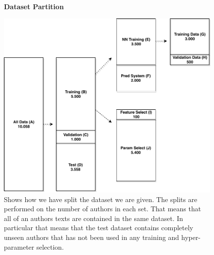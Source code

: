 \begin{figure}
    \centering
    \textbf{Dataset Partition}\par\medskip
    \includegraphics[width=.6\textwidth]{./pictures/data/data_split}
    \caption{Shows how we have split the dataset we are given. The splits are
        performed on the number of authors in each set. That means that all of
        an authors texts are contained in the same dataset. In particular that
        means that the test dataset contains completely unseen authors that has
        not been used in any training and hyper-parameter selection.}
    \label{fig:data_split}
\end{figure}

